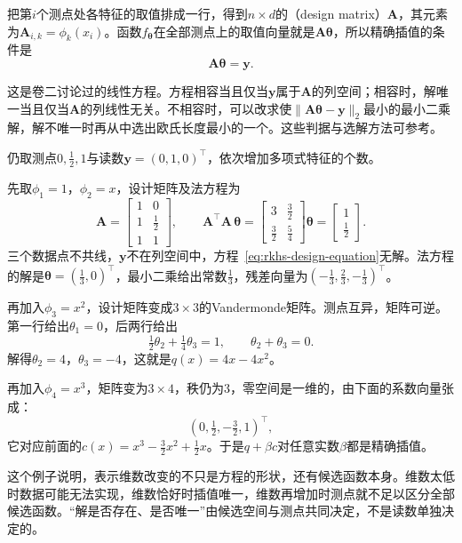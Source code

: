 把第$i$个测点处各特征的取值排成一行，得到$n\times d$的（design matrix）$\bm A$，其元素为$\bm A_{i,k}=\phi_k(x_i)$。函数$f_{\bm\theta}$在全部测点上的取值向量就是$\bm A\bm\theta$，所以精确插值的条件是
\begin{equation}
\bm A\bm\theta=\bm y .
\label{eq:rkhs-design-equation}
\end{equation}

这是卷二讨论过的线性方程。方程相容当且仅当$\bm y$属于$\bm A$的列空间；相容时，解唯一当且仅当$\bm A$的列线性无关。不相容时，可以改求使$\lVert\bm A\bm\theta-\bm y\rVert_2$最小的最小二乘解，解不唯一时再从中选出欧氏长度最小的一个。这些判据与选解方法可参考。

\begin{example}[多项式特征下的三种情形]
\label{ex:rkhs-polynomial-features}
仍取测点$0,\tfrac12,1$与读数$\bm y=(0,1,0)^{\top}$，依次增加多项式特征的个数。

先取$\phi_1=1$，$\phi_2=x$，设计矩阵及法方程为
\[
\bm A=\begin{bmatrix}1&0\\1&\tfrac12\\1&1\end{bmatrix},\qquad
\bm A^{\top}\bm A\,\bm\theta=\begin{bmatrix}3&\tfrac32\\\tfrac32&\tfrac54\end{bmatrix}\bm\theta=\begin{bmatrix}1\\\tfrac12\end{bmatrix}.
\]
三个数据点不共线，$\bm y$不在列空间中，方程~\eqref{eq:rkhs-design-equation}无解。法方程的解是$\bm\theta=(\tfrac13,0)^{\top}$，最小二乘给出常数$\tfrac13$，残差向量为$(-\tfrac13,\tfrac23,-\tfrac13)^{\top}$。

再加入$\phi_3=x^2$，设计矩阵变成$3\times3$的Vandermonde矩阵。测点互异，矩阵可逆。第一行给出$\theta_1=0$，后两行给出
\[
\tfrac12\theta_2+\tfrac14\theta_3=1,\qquad \theta_2+\theta_3=0 .
\]
解得$\theta_2=4$，$\theta_3=-4$，这就是$q(x)=4x-4x^2$。

再加入$\phi_4=x^3$，矩阵变为$3\times4$，秩仍为$3$，零空间是一维的，由下面的系数向量张成：
\[
(0,\tfrac12,-\tfrac32,1)^{\top},
\]
它对应前面的$c(x)=x^3-\tfrac32x^2+\tfrac12x$。于是$q+\beta c$对任意实数$\beta$都是精确插值。
\end{example}

这个例子说明，表示维数改变的不只是方程的形状，还有候选函数本身。维数太低时数据可能无法实现，维数恰好时插值唯一，维数再增加时测点就不足以区分全部候选函数。“解是否存在、是否唯一”由候选空间与测点共同决定，不是读数单独决定的。


